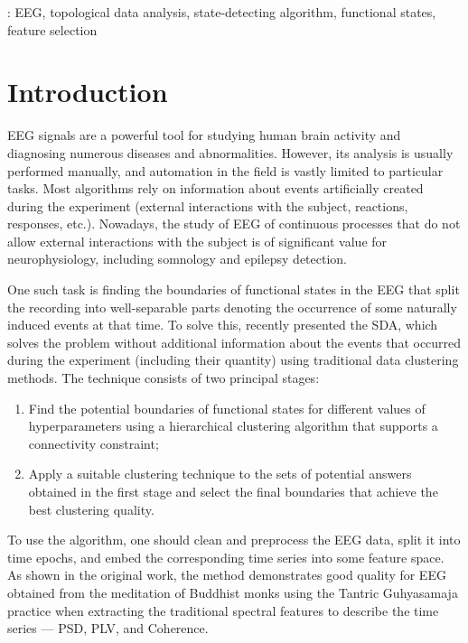 \documentclass[10pt]{iopart}
\begin{document}
\vspace{2pc}
: EEG, topological data analysis, state-detecting algorithm, functional states, feature selection

\submitto{\JNE}

\ioptwocol{}

\section{Introduction}

EEG signals are a powerful tool for studying human brain activity and diagnosing numerous diseases and abnormalities. However, its analysis is usually performed manually, and automation in the field is vastly limited to particular tasks. Most algorithms rely on information about events artificially created during the experiment (external interactions with the subject, reactions, responses, etc.). Nowadays, the study of EEG of continuous processes that do not allow external interactions with the subject is of significant value for neurophysiology, including somnology and epilepsy detection.

One such task is finding the boundaries of functional states in the EEG that split the recording into well-separable parts denoting the occurrence of some naturally induced events at that time. To solve this, \cite{SDA} recently presented the SDA, which solves the problem without additional information about the events that occurred during the experiment (including their quantity) using traditional data clustering methods. The technique consists of two principal stages:
\begin{enumerate}
    \item
        Find the potential boundaries of functional states for different values of hyperparameters using a hierarchical clustering algorithm that supports a connectivity constraint;
    \item
        Apply a suitable clustering technique to the sets of potential answers obtained in the first stage and select the final boundaries that achieve the best clustering quality.
\end{enumerate}


To use the algorithm, one should clean and preprocess the EEG data, split it into time epochs, and embed the corresponding time series into some feature space. As shown in the original work, the method demonstrates good quality for EEG obtained from the meditation of Buddhist monks using the Tantric Guhyasamaja practice when extracting the traditional spectral features to describe the time series --- PSD, PLV, and Coherence.
\end{document}
